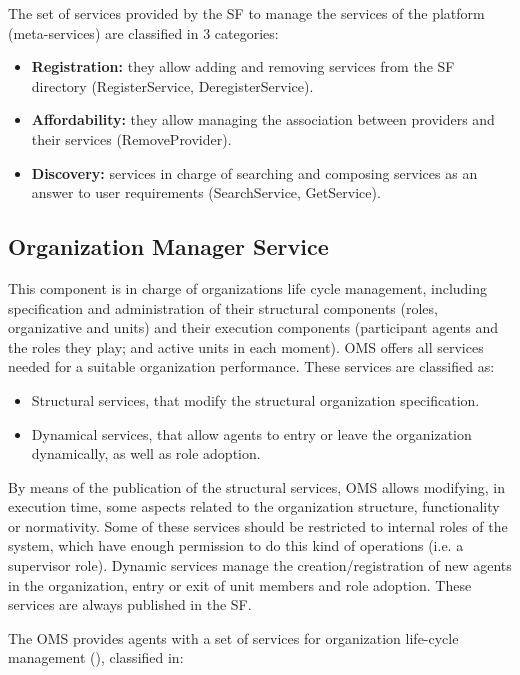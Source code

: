 The set of services provided by the SF to manage the services of the platform (meta-services) are classified in 3 categories:

\begin{itemize}
	\item \textbf{Registration:} they allow adding and removing services from the SF directory (RegisterService, DeregisterService).
	\item \textbf{Affordability:} they allow managing the association between providers and their services (RemoveProvider).
	\item \textbf{Discovery:} services in charge of searching and composing services as an answer to user requirements (SearchService, GetService).
\end{itemize}

\subsection{Organization Manager Service}
This component is in charge of organizations life cycle management, including specification and administration of their structural components (roles, organizative and units) and their execution components (participant agents and the roles they play; and active units in each moment). OMS offers all services needed for a suitable organization performance. These services are classified as:

\begin{itemize}
	\item Structural services, that modify the structural organization specification.
	\item Dynamical services, that allow agents to entry or leave the organization dynamically, as well as role adoption.
\end{itemize}

By means of the publication of the structural services, OMS allows modifying, in execution time, some aspects related to the organization structure, functionality or normativity. Some of these services should be restricted to internal roles of the system, which have enough permission to do this kind of operations (i.e. a supervisor role). Dynamic services manage the creation/registration of new agents in the organization, entry or exit of unit members and role adoption. These services are always published in the SF.

The OMS provides agents with a set of services for organization life-cycle management (\cite{DelVal09}), classified in: 

